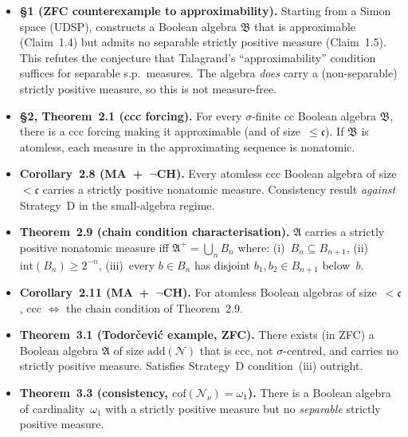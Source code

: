\begin{itemize}[nosep]
  \item \textbf{\S 1 (ZFC counterexample to approximability).}
    Starting from a Simon space (UDSP), constructs a Boolean algebra
    $\mathfrak{B}$ that is approximable (Claim~1.4) but admits no
    separable strictly positive measure (Claim~1.5).  This refutes the
    conjecture that Talagrand's ``approximability'' condition suffices
    for separable s.p.\ measures.  The algebra \emph{does} carry a
    (non-separable) strictly positive measure, so this is not
    measure-free.

  \item \textbf{\S 2, Theorem~2.1 (ccc forcing).}  For every
    $\sigma$-finite cc Boolean algebra $\mathfrak{B}$, there is a ccc
    forcing making it approximable (and of size~$\leq \mathfrak{c}$).
    If $\mathfrak{B}$ is atomless, each measure in the approximating
    sequence is nonatomic.

  \item \textbf{Corollary~2.8 (MA~+~$\neg$CH).}  Every atomless ccc
    Boolean algebra of size~$< \mathfrak{c}$ carries a strictly
    positive nonatomic measure.  Consistency result \emph{against}
    Strategy~D in the small-algebra regime.

  \item \textbf{Theorem~2.9 (chain condition characterisation).}
    $\mathfrak{A}$ carries a strictly positive nonatomic measure iff
    $\mathfrak{A}^+ = \bigcup_n B_n$ where: (i)~$B_n \subseteq
    B_{n+1}$, (ii)~$\mathrm{int}(B_n) \geq 2^{-n}$, (iii)~every
    $b \in B_n$ has disjoint $b_1, b_2 \in B_{n+1}$ below~$b$.

  \item \textbf{Corollary~2.11 (MA~+~$\neg$CH).}  For atomless
    Boolean algebras of size~$< \mathfrak{c}$, ccc $\iff$ the chain
    condition of Theorem~2.9.

  \item \textbf{Theorem~3.1 (Todor\v{c}evi\'{c} example, ZFC).}
    There exists (in ZFC) a Boolean algebra $\mathfrak{A}$ of
    size $\mathrm{add}(\mathcal{N})$ that is ccc, not
    $\sigma$-centred, and carries no strictly positive measure.
    Satisfies Strategy~D condition~(iii) outright.

  \item \textbf{Theorem~3.3 (consistency, $\mathrm{cof}(\mathcal{N}_\nu)
    = \omega_1$).}  There is a Boolean algebra of cardinality~$\omega_1$
    with a strictly positive measure but no \emph{separable} strictly
    positive measure.
\end{itemize}

